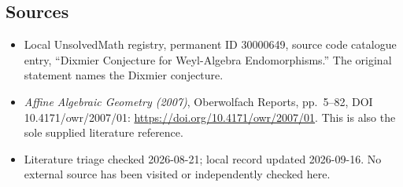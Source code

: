 \documentclass[11pt]{article}
\begin{document}
\subsection{Sources}
\begin{itemize}
\item Local UnsolvedMath registry, permanent ID 30000649, source code catalogue entry, ``Dixmier Conjecture for Weyl-Algebra Endomorphisms.'' The original statement names the Dixmier conjecture.
\item \emph{Affine Algebraic Geometry (2007)}, Oberwolfach Reports, pp.\ 5--82, DOI 10.4171/owr/2007/01: \url{https://doi.org/10.4171/owr/2007/01}. This is also the sole supplied literature reference.
\item Literature triage checked 2026-08-21; local record updated 2026-09-16. No external source has been visited or independently checked here.
\end{itemize}
\end{document}

